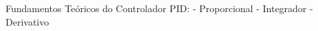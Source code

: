 \documentclass[preview]{standalone}
\begin{document}
Fundamentos Teóricos do Controlador PID:
- Proporcional
- Integrador
- Derivativo\\
\end{document}
